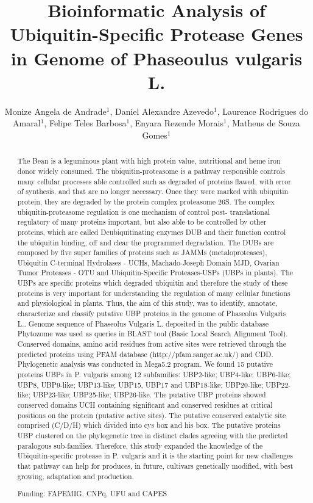 \documentclass[twoside]{article}
\title{\vspace{-15mm}\fontsize{24pt}{10pt}\selectfont\textbf{Bioinformatic Analysis of Ubiquitin-Specific Protease Genes in Genome of Phaseoulus vulgaris L.}} %
\author{Monize Angela de Andrade$^1$, Daniel Alexandre Azevedo$^1$, Laurence Rodrigues do Amaral$^1$, Felipe Teles Barbosa$^1$, Enyara Rezende Morais$^1$, Matheus de Souza Gomes$^1$}
\affil{1 UFMG\\ }
\date{}
\begin{document}
\maketitle %

\thispagestyle{fancy} %


\begin{abstract}
The Bean is a leguminous plant with high protein value, nutritional and heme iron donor widely consumed. The ubiquitin-proteasome is a pathway responsible controls many cellular processes able controlled such as degraded of proteins flawed, with error of synthesis, and that are no longer necessary. Once they were marked with ubiquitin protein, they are degraded by the protein complex proteasome 26S. The complex ubiquitin-proteasome regulation is one mechanism of control post- translational regulatory of many proteins important, but also able to be controlled by other proteins, which are called Deubiquitinating enzymes DUB and their function control the ubiquitin binding, off and clear the programmed degradation. The DUBs are composed by five super families of proteins such as JAMMs (metaloproteases), Ubiquitin C-terminal Hydrolases - UCHs, Machado-Joseph Domain MJD, Ovarian Tumor Proteases - OTU and Ubiquitin-Specific Proteases-USPs (UBPs in plants). The UBPs are specific proteins which degraded ubiquitin and therefore the study of these proteins is very important for understanding the regulation of many cellular functions and physiological in plants. Thus, the aim of this study, was to identify, annotate, characterize and classify putative UBP proteins in the genome of Phaseolus Vulgaris L.. Genome sequence of Phaseolus Vulgaris L. deposited in the public database Phytozome was used as queries in BLAST tool (Basic Local Search Alignment Tool). Conserved domains, amino acid residues from active sites were retrieved through the predicted proteins using PFAM database (http://pfam.sanger.ac.uk/) and CDD. Phylogenetic analysis was conducted in Mega5.2 program. We found 15 putative proteins UBPs in P. vulgaris among 12 subfamilies: UBP2-like; UBP4-like; UBP6-like; UBP8, UBP9-like; UBP13-like; UBP15, UBP17 and UBP18-like; UBP20-like; UBP22-like; UBP23-like; UBP25-like; UBP26-like. The putative UBP proteins showed conserved domains UCH containing significant and conserved residues at critical positions on the protein (putative active sites). The putative conserved catalytic site comprised (C/D/H) which divided into cys box and his box. The putative proteins UBP clustered on the phylogenetic tree in distinct clades agreeing with the predicted paralogous sub-families. Therefore, this study expanded the knowledge of the Ubiquitin-specific protease in P. vulgaris and it is the starting point for new challenges that pathway can help for produces, in future, cultivars genetically modified, with best growing, adaptation and production.

Funding: FAPEMIG, CNPq, UFU and CAPES
\end{abstract}
\end{document}
